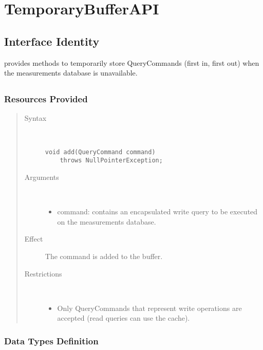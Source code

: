 \section{TemporaryBufferAPI}

\subsection{Interface Identity}

\npar {} provides methods to temporarily store 
QueryCommands (first in, first out) when the measurements database is
unavailable.

\subsection{}

\subsubsection{Resources Provided}

\begin{quote}
	\begin{description}
		\item[Syntax] \ 
		\begin{verbatim}
void add(QueryCommand command) 
    throws NullPointerException;
		\end{verbatim}
		\item[Arguments] \
		\begin{itemize}
			\item command: contains an encapsulated write query to be executed on the
			measurements database.
		\end{itemize}
		\item[Effect] The command is added to the buffer. 
		\item[Restrictions] \ 
		\begin{itemize}
			\item Only QueryCommands that represent write operations are accepted (read
			queries can use the cache). 
		\end{itemize}
	\end{description} 
\end{quote}

\subsubsection{Data Types Definition}

